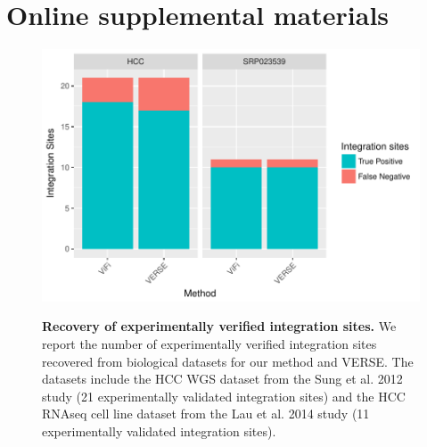 \documentclass[10pt]{article}
\begin{document}



\section*{Online supplemental materials}
\setcounter{figure}{0}
\renewcommand{\thesection}{S.\arabic{section}}   
\renewcommand{\thefigure}{S\arabic{figure}}   
\renewcommand{\thetable}{S\arabic{table}}   

\begin{figure}[htpb]
  \centering
  \includegraphics[width=1\linewidth]{results/hcc.pdf}\\
\caption[Recovery of experimentally verified integration sites from biological datasets.]
{\label{bio_results}  {\bf Recovery of experimentally verified integration sites.}  We report the number of experimentally verified integration sites recovered from biological datasets for our method and VERSE.  The datasets include the HCC WGS dataset from the Sung et al. 2012 study (21 experimentally validated integration sites) and the HCC RNAseq cell line dataset from the Lau et al. 2014 study (11 experimentally validated integration sites).}
\end{figure}

\end{document}
